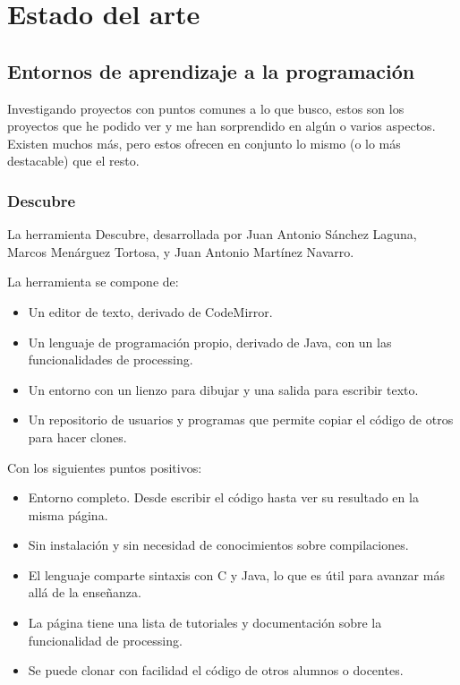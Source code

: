\documentclass{report}
\begin{document}
	
	\chapter{Estado del arte}
	
	\section{Entornos de aprendizaje a la programación}
	
	Investigando proyectos con puntos comunes a lo que busco, estos son los proyectos que he podido ver y me han sorprendido en algún o varios aspectos. Existen muchos más, pero estos ofrecen en conjunto lo mismo (o lo más destacable) que el resto.
	
	\subsection{Descubre}
	
	La herramienta Descubre, desarrollada por Juan Antonio Sánchez Laguna, Marcos Menárguez Tortosa, y Juan Antonio Martínez Navarro. 
	
	La herramienta se compone de:
	
	
	\begin{itemize}
		\item Un editor de texto, derivado de CodeMirror.
		\item Un lenguaje de programación propio, derivado de Java, con un las funcionalidades de processing.
		\item Un entorno con un lienzo para dibujar y una salida para escribir texto.
		\item Un repositorio de usuarios y programas que permite copiar el código de otros para hacer clones. 
	\end{itemize}
	
	Con los siguientes puntos positivos:
	
	\begin{itemize}
		\item Entorno completo. Desde escribir el código hasta ver su resultado en la misma página.
		\item Sin instalación y sin necesidad de conocimientos sobre compilaciones.
		\item El lenguaje comparte sintaxis con C y Java, lo que es útil para avanzar más allá de la enseñanza. 
		\item La página tiene una lista de tutoriales y documentación sobre la funcionalidad de processing.
		\item Se puede clonar con facilidad el código de otros alumnos o docentes.
	\end{itemize}
	
\end{document}

